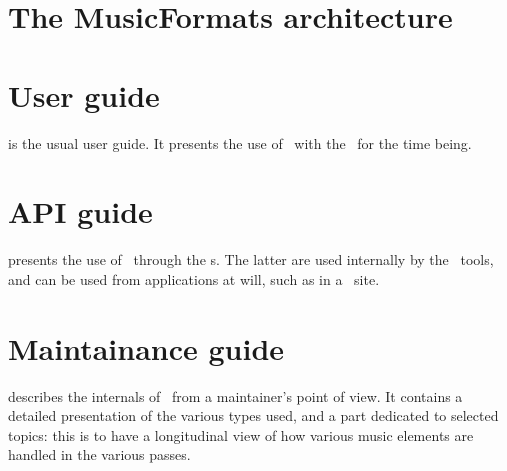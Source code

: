 \section{The MusicFormats architecture}


\section{User guide}

 is the usual user guide. It presents the use of \mf\ with the \CLI\ for the time being.


\section{API guide}

 presents the use of \mf\ through the \API s. The latter are used internally by the \CLI\ tools, and can be used from applications at will, such as in a \Web\ site.


\section{Maintainance guide}

 describes the internals of \mf\ from a maintainer's point of view. It contains a detailed presentation of the various types used, and a part dedicated to selected topics: this is to have a longitudinal view of how various music elements are handled in the various passes.

